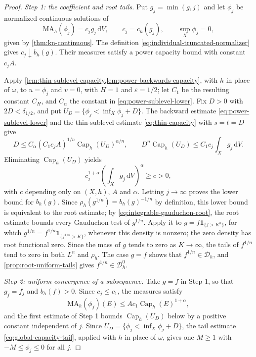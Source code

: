 \begin{proof}
\emph{Step 1: the coefficient and root tails.} Put $g_j=\min(g,j)$ and let $\phi_j$ be normalized continuous solutions of
\[
 \mathrm{MA}_h(\phi_j)=c_jg_j\,\mathrm dV,
 \qquad c_j=c_h(g_j),\qquad \sup_X\phi_j=0,
\]
given by \cref{thm:kn-continuous}. The definition \eqref{eq:individual-truncated-normalizer} gives $c_j\downarrow b_h(g)$. Their measures satisfy a power capacity bound with constant $c_jA$.

Apply \cref{lem:thin-sublevel-capacity,lem:power-backwards-capacity}, with $h$ in place of $\omega$, to $u=\phi_j$ and $v=0$, with $H=1$ and $\varepsilon=1/2$; let $C_1$ be the resulting constant $C_H$, and $C_\alpha$ the constant in \eqref{eq:power-sublevel-lower}. Fix $D>0$ with $2D<\delta_{1/2}$, and put $U_D=\{\phi_j<\inf_X\phi_j+D\}$. The backward estimate \eqref{eq:power-sublevel-lower} and the thin-sublevel estimate \eqref{eq:thin-capacity} with $s=t=D$ give
\[
 D\leq C_\alpha(C_1c_jA)^{1/n}
                   \operatorname{Cap}_h(U_D)^{\alpha/n},
 \qquad
 D^n\operatorname{Cap}_h(U_D)
       \leq C_1c_j\int_Xg_j\,\mathrm dV.
\]
Eliminating $\operatorname{Cap}_h(U_D)$ yields
\[
 c_j^{1+\alpha}\left(\int_Xg_j\,\mathrm dV\right)^\alpha\geq c>0,
\]
with $c$ depending only on $(X,h)$, $A$ and $\alpha$. Letting $j\to\infty$ proves the lower bound for $b_h(g)$. Since $\rho_h(g^{1/n})=b_h(g)^{-1/n}$ by definition, this lower bound is equivalent to the root estimate; by \eqref{eq:integrable-gauduchon-root}, the root estimate bounds every Gauduchon test of $g^{1/n}$. Apply it to $g=f\mathbf1_{\{f>K^n\}}$, for which $g^{1/n}=f^{1/n}\mathbf1_{\{f^{1/n}>K\}}$, whenever this density is nonzero; the zero density has root functional zero. Since the mass of $g$ tends to zero as $K\to\infty$, the tails of $f^{1/n}$ tend to zero in both $L^n$ and $\rho_h$. The case $g=f$ shows that $f^{1/n}\in\mathcal D_h$, and \cref{prop:root-uniform-tails} gives $f^{1/n}\in\mathcal D_h^0$.

\emph{Step 2: uniform convergence of a subsequence.} Take $g=f$ in Step 1, so that $g_j=f_j$ and $b_h(f)>0$. Since $c_j\leq c_1$, the measures satisfy
\[
 \mathrm{MA}_h(\phi_j)(E)
       \leq Ac_1\operatorname{Cap}_h(E)^{1+\alpha},
\]
and the first estimate of Step 1 bounds $\operatorname{Cap}_h(U_D)$ below by a positive constant independent of $j$. Since $U_D=\{\phi_j<\inf_X\phi_j+D\}$, the tail estimate \eqref{eq:global-capacity-tail}, applied with $h$ in place of $\omega$, gives one $M\geq1$ with $-M\leq\phi_j\leq0$ for all $j$.


\end{proof}
